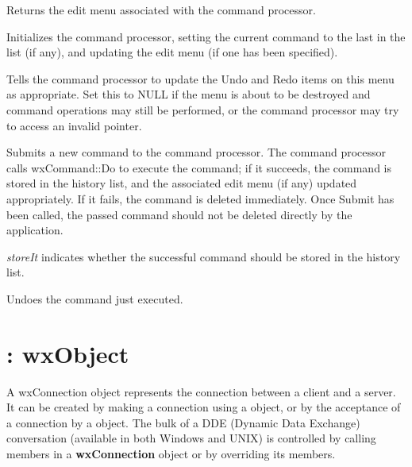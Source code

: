 

Returns the edit menu associated with the command processor.



Initializes the command processor, setting the current command to the
last in the list (if any), and updating the edit menu (if one has been
specified).



Tells the command processor to update the Undo and Redo items on this
menu as appropriate. Set this to NULL if the menu is about to be
destroyed and command operations may still be performed, or the command
processor may try to access an invalid pointer.



Submits a new command to the command processor. The command processor
calls wxCommand::Do to execute the command; if it succeeds, the command
is stored in the history list, and the associated edit menu (if any) updated
appropriately. If it fails, the command is deleted
immediately. Once Submit has been called, the passed command should not
be deleted directly by the application.

{\it storeIt} indicates whether the successful command should be stored
in the history list.



Undoes the command just executed.






\section{: wxObject}\label{wxconnection}


A wxConnection object represents the connection between a client and a
server. It can be created by making a connection using a\rtfsp
{} object, or by the acceptance of a connection by a\rtfsp
{} object. The bulk of a DDE (Dynamic Data Exchange)
conversation (available in both Windows and UNIX) is controlled by
calling members in a {\bf wxConnection} object or by overriding its
members.

